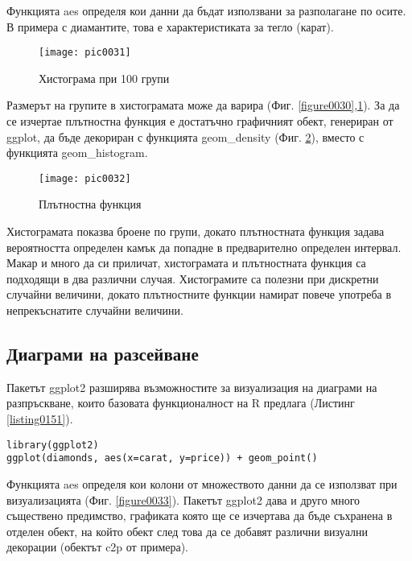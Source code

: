 Функцията aes определя кои данни да бъдат използвани за разполагане по осите. В примера с диамантите, това е характеристиката за тегло (карат). 

\begin{figure}[h!]
  \centering
  \texttt{[image: pic0031]}
  \caption{Хистограма при 100 групи}
\label{figure0031}
\end{figure}
\FloatBarrier

Размерът на групите в хистограмата може да варира (Фиг. \ref{figure0030},\ref{figure0031}). За да се изчертае плътностна функция е достатъчно графичният обект, генериран от ggplot, да бъде декориран с функцията geom\_density (Фиг. \ref{figure0032}), вместо с функцията geom\_histogram. 


\begin{figure}[h!]
  \centering
  \texttt{[image: pic0032]}
  \caption{Плътностна функция}
\label{figure0032}
\end{figure}
\FloatBarrier

Хистограмата показва броене по групи, докато плътностната функция задава вероятността определен камък да попадне в предварително определен интервал. Макар и много да си приличат, хистограмата и плътностната функция са подходящи в два различни случая. Хистограмите са полезни при дискретни случайни величини, докато плътностните функции намират повече употреба в непрекъснатите случайни величини. 

\subsection{Диаграми на разсейване}

Пакетът ggplot2 разширява възможностите за визуализация на диаграми на разпръскване, които базовата функционалност на R предлага (Листинг \ref{listing0151}). 

\begin{lstlisting}[caption=Диаграма на разпръскване с ggplot2, label=listing0151]
library(ggplot2)
ggplot(diamonds, aes(x=carat, y=price)) + geom_point()
\end{lstlisting}

Функцията aes определя кои колони от множеството данни да се използват при визуализацията (Фиг. \ref{figure0033}). Пакетът ggplot2 дава и друго много съществено предимство, графиката която ще се изчертава да бъде съхранена в отделен обект, на който обект след това да се добавят различни визуални декорации (обектът c2p от примера).


